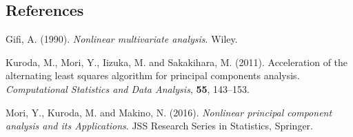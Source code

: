 \documentclass[12pt]{article}
\begin{document}
%        
%
%        

\subsection*{References}

\begin{description}
%
\item
Gifi, A. (1990).
\textit{Nonlinear multivariate analysis}. Wiley. 
%
\item
Kuroda, M., Mori, Y., Iizuka, M. and Sakakihara, M. (2011). 
Acceleration of the alternating least squares algorithm for principal components analysis. 
\textit{Computational Statistics and Data Analysis}, \textbf{55}, 143--153.
%
\item
Mori, Y., Kuroda, M. and Makino, N. (2016).
\textit{Nonlinear principal component analysis and its Applications}.
JSS Research Series in Statistics, Springer.

\end{description}
\end{document}
